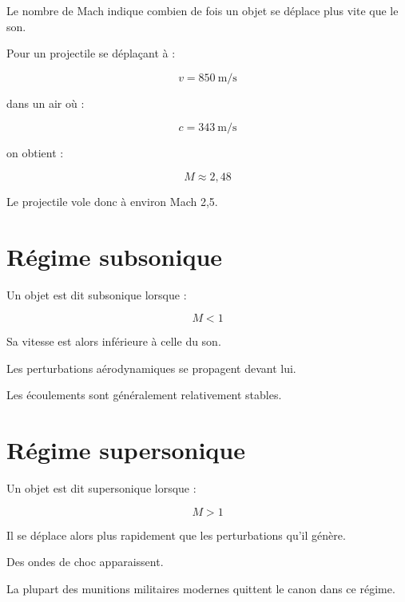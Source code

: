 Le nombre de Mach indique combien de fois un objet se déplace plus vite que
le son.

\begin{exemple}

Pour un projectile se déplaçant à :

\begin{equation}
v = 850~\mathrm{m/s}
\end{equation}

dans un air où :

\begin{equation}
c = 343~\mathrm{m/s}
\end{equation}

on obtient :

\begin{equation}
M \approx 2,48
\end{equation}

Le projectile vole donc à environ Mach 2,5.

\end{exemple}

\section{Régime subsonique}

Un objet est dit subsonique lorsque :

\begin{equation}
M < 1
\end{equation}

Sa vitesse est alors inférieure à celle du son.

Les perturbations aérodynamiques se propagent devant lui.

Les écoulements sont généralement relativement stables.

\section{Régime supersonique}

Un objet est dit supersonique lorsque :

\begin{equation}
M > 1
\end{equation}

Il se déplace alors plus rapidement que les perturbations qu'il génère.

Des ondes de choc apparaissent.

La plupart des munitions militaires modernes quittent le canon dans ce
régime.

